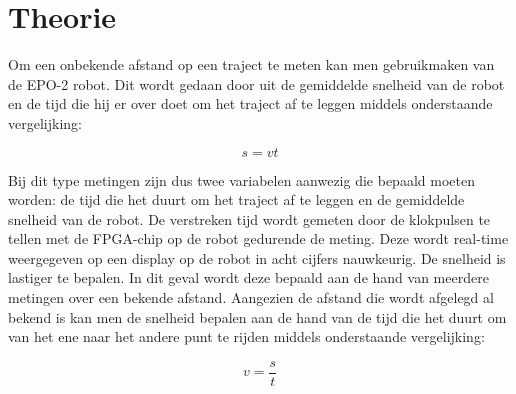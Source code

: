 \documentclass{report}
\begin{document}
\chapter{Theorie}
Om een onbekende afstand op een traject te meten kan men gebruikmaken van de EPO-2 robot. Dit wordt gedaan door uit de gemiddelde snelheid van de robot en de tijd 
die hij er over doet om het traject af te leggen middels onderstaande vergelijking:

\begin{equation}
s = vt
\end{equation}

Bij dit type metingen zijn dus twee variabelen aanwezig die bepaald moeten worden: de tijd die het duurt om het traject af te leggen en de gemiddelde snelheid van de robot. 
De verstreken tijd wordt gemeten door de klokpulsen te tellen met de FPGA-chip op de robot gedurende de meting. Deze wordt real-time weergegeven op een display op de robot in acht cijfers nauwkeurig.
De snelheid is lastiger te bepalen. In dit geval wordt deze bepaald aan de hand van meerdere metingen over een bekende afstand. Aangezien de afstand die wordt afgelegd al bekend is kan men de snelheid bepalen aan de hand van de tijd die het duurt om van het ene naar het andere punt te rijden middels onderstaande vergelijking:

\begin{equation}
\label{eq:vel}
v=\frac{s}{t}
\end{equation}
\end{document}

